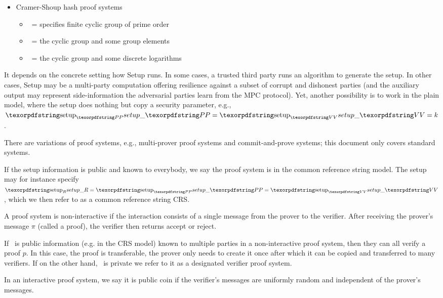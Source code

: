\begin{itemize}
\item Cramer-Shoup hash proof systems
	\begin{itemize}
	\item \setR\ = specifies finite cyclic group of prime order
	\item \setP\ = the cyclic group and some group elements
	\item \setV\ = the cyclic group and some discrete logarithms
	\end{itemize}

\end{itemize}


It depends on the concrete setting how Setup runs. 
In some cases, a trusted third party runs an algorithm to generate the setup. 
In other cases, Setup may be a multi-party computation offering resilience against a subset of corrupt and dishonest parties (and the auxiliary output may represent side-information the adversarial parties learn from the MPC protocol). 
Yet, another possibility is to work in the plain model, where the setup does nothing but copy a security parameter, e.g., $\setP = \setV = k$.
 
There are variations of proof systems, e.g., multi-prover proof systems and commit-and-prove systems; this document only covers standard systems.


If the setup information is public and known to everybody, we say the proof system is in the common reference string model. 
The setup may for instance specify $\setR = \setP = \setV$, which we then refer to as a common reference string CRS.
 
A proof system is non-interactive if the interaction consists of a single message from the prover to the verifier.
After receiving the prover's message $\pi$ (called a proof), the verifier then returns accept or reject.
 
If \setV\ is public information (e.g. in the CRS model) known to multiple parties in a non-interactive proof system, then they can all verify a proof $p$. 
In this case, the proof is transferable, the prover only needs to create it once after which it can be copied and transferred to many verifiers. 
If on the other hand, \setV\ is private we refer to it as a designated verifier proof system.
 
In an interactive proof system, we say it is public coin if the verifier's messages are uniformly random and independent of the prover's messages.

